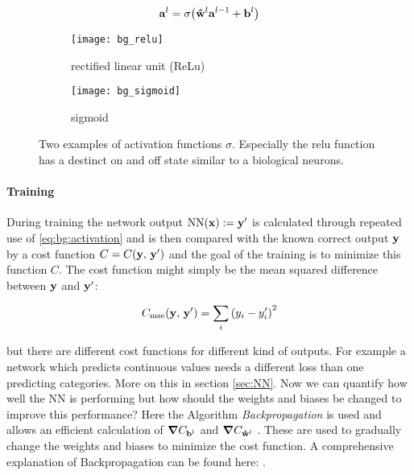 \begin{equation} \label{eq:bg:activation}
    \vb{a}^l = \sigma \qty(\vu{w}^l \vb{a}^{l-1} + \vb{b}^l)
\end{equation}

\begin{figure}[H]
\centering
\begin{subfigure}{.5\textwidth}
    \centering
    \texttt{[image: bg\_relu]}
    \caption{rectified linear unit (ReLu)}
    \label{}
\end{subfigure}%
\begin{subfigure}{.5\textwidth}
    \centering
    \texttt{[image: bg\_sigmoid]}
    \caption{sigmoid}
    \label{}
\end{subfigure}
\caption{Two examples of activation functions $\sigma$. Especially the relu function has a destinct on and off state similar to a biological neurons.}
\label{fig:al:act}
\end{figure}

\paragraph{Training}
During training the network output $\mathrm{NN}(\vb x) := \vb{y}' $ is calculated through repeated use of \eqref{eq:bg:activation} and is then compared with the known correct output $\vb y$ by a cost function $C = C(\vb y, \, \vb y')$ and the goal of the training is to minimize this function $C$. The cost function might simply be the mean squared difference between $\vb y$ and $\vb y'$:

\begin{equation}
    C_{\mathrm{mse}}(\vb y, \, \vb y') = \sum_i \qty(y_i - y_i')^2
\end{equation}

\noindent
but there are different cost functions for different kind of outputs. For example a network which predicts continuous values needs a different loss than one predicting categories. More on this in section \ref{sec:NN}. Now we can quantify how well the NN is performing but how should the weights and biases be changed to improve this performance?
Here the Algorithm \textit{Backpropagation} is used and allows an efficient calculation of $\grad{C}_{\vb{b}^l}$ and $\grad{C}_{\vu{w}^l}$ . These are used to gradually change the weights and biases to minimize the cost function. A comprehensive explanation of Backpropagation can be found here: \cite{backprop}.

